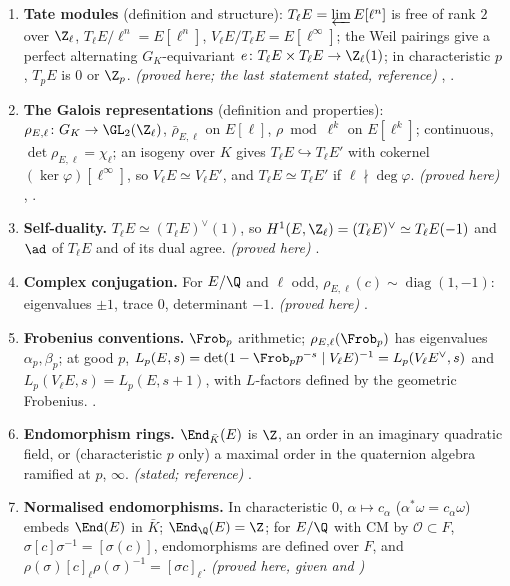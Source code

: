 \begin{enumerate}[label=\textbf{\thechapter.\arabic*}]
rational point of order $\ell$ gives $0\to\Z/\ell\to E[\ell]\to\mu_\ell\to0$. \emph{(proved here)} .
\item \textbf{Tate modules} (definition and structure): $T_\ell E=\varprojlim E[\ell^n]$ is free of rank $2$ over $\Z_\ell$, $T_\ell E/\ell^n=E[\ell^n]$, $V_\ell E/T_\ell E=E[\ell^\infty]$; the Weil pairings give a perfect
alternating $G_K$-equivariant $e\colon T_\ell E\times T_\ell E\to\Z_\ell(1)$; in characteristic $p$, $T_pE$ is $0$ or $\Z_p$. \emph{(proved here; the last statement stated, reference)} , .
\item \textbf{The Galois representations} (definition and properties): $\rho_{E,\ell}\colon G_K\to\GL_2(\Z_\ell)$, $\bar\rho_{E,\ell}$ on $E[\ell]$, $\rho\bmod\ell^k$ on $E[\ell^k]$; continuous, $\det\rho_{E,\ell}=\chi_\ell$; an
isogeny over $K$ gives $T_\ell E\hookrightarrow T_\ell E'$ with cokernel $(\ker\varphi)[\ell^\infty]$, so $V_\ell E\simeq V_\ell E'$, and $T_\ell E\simeq T_\ell E'$ if $\ell\nmid\deg\varphi$. \emph{(proved here)}
, .
\item \textbf{Self-duality.} $T_\ell E\simeq(T_\ell E)^\vee(1)$, so $H^1(E,\Z_\ell)=(T_\ell E)^\vee\simeq T_\ell E(-1)$ and $\ad$ of $T_\ell E$ and of its dual agree. \emph{(proved here)} .
\item \textbf{Complex conjugation.} For $E/\Q$ and $\ell$ odd, $\rho_{E,\ell}(c)\sim\operatorname{diag}(1,-1)$: eigenvalues $\pm1$, trace $0$, determinant $-1$. \emph{(proved here)} .
\item \textbf{Frobenius conventions.} $\Frob_p$ arithmetic; $\rho_{E,\ell}(\Frob_p)$ has eigenvalues $\alpha_p,\beta_p$; at good $p$, $L_p(E,s)=\det(1-\Frob_pp^{-s}\mid V_\ell E)^{-1}=L_p(V_\ell E^\vee,s)$ and
$L_p(V_\ell E,s)=L_p(E,s+1)$, with $L$-factors defined by the geometric Frobenius. .
\item \textbf{Endomorphism rings.} $\End_{\bar K}(E)$ is $\Z$, an order in an imaginary quadratic field, or (characteristic $p$ only) a maximal order in the quaternion algebra ramified at $p$, $\infty$.
\emph{(stated; reference)} .
\item \textbf{Normalised endomorphisms.} In characteristic $0$, $\alpha\mapsto c_\alpha$ ($\alpha^*\omega=c_\alpha\omega$) embeds $\End(E)$ in $\bar K$; $\End_\Q(E)=\Z$; for $E/\Q$ with CM by $\mathcal O\subset F$,
$\sigma[c]\sigma^{-1}=[\sigma(c)]$, endomorphisms are defined over $F$, and $\rho(\sigma)[c]_\ell\rho(\sigma)^{-1}=[\sigma c]_\ell$. \emph{(proved here, given  and )}

\end{enumerate}

